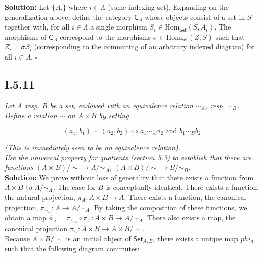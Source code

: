 \documentclass[11pt,a4paper]{article}
\newcommand{\morph}[3]{\text{Hom}_{#1}(#2,#3)}
\newcommand{\overbar}[1]{\mkern 1.5mu\overline{\mkern-1.5mu#1\mkern-1.5mu}\mkern 1.5mu}
\begin{document}
\noindent \textbf{Solution: } Let $\{A_i\}$ where $i \in \Lambda$ (some indexing set).  Expanding on the generalization above, define the category $\textsf{C}_{\Lambda}$ whose objects consist of a set in $S$ together with, for all $i \in \Lambda$ a single morphism $S_i \in \morph{\textsf{Set}}{S}{A_i}$.  The morphisms of $\textsf{C}_{\Lambda}$ correspond to the morphisms $\sigma \in \morph{\textsf{Set}}{Z}{S}$ such that $Z_i = \sigma S_i$ (corresponding to the commuting of an arbitrary indexed diagram) for all $i \in \Lambda$. $\square$

\subsection*{I.5.11} \textit{Let $A$ resp. $B$ be a set, endowed with an equivalence relation $\sim_A$, resp. $\sim_B$.  Define a relation $\sim$ on $A \times B$ by setting}

$$(a_1,b_1) \sim (a_2,b_2) \iff a_1 \sim_A a_2 \text{ and } b_1 \sim_B b_2.$$

\noindent \textit{(This is immediately seen to be an equivalence relation).} \\

\noindent \textit{Use the universal property for quotients (section 5.3) to establish that there are functions $(A \times B)/\sim \rightarrow A / \sim_A$, $(A \times B)/\sim \rightarrow B /\sim_B$.} \\

\noindent \textbf{Solution: } We prove without loss of generality that there exists a function from $A \times B$ to $A / \sim_{A}$.  The case for $B$ is conceptually identical. There exists a function, the natural projection, $\pi_A: A \times B \rightarrow A$.  There exists a function, the canonical projection, $\pi_{\sim_A}: A \rightarrow A / \sim_A$.  By taking the composition of these functions, we obtain a map $\phi_A = \pi_{\sim_A} \circ \pi_A : A \times B \rightarrow A / \sim_{A}$.  There also exists a map, the canonical projection $\pi_{\sim}: A \times B \rightarrow A \times B / \sim$. \\

\noindent Because $A \times B / \sim$ is an initial object of $\textsf{Set}_{A,B}$, there exists a unique map $\bar{phi_a}$ such that the following diagram commutes:

\begin{center}
\end{center}
\end{document}
